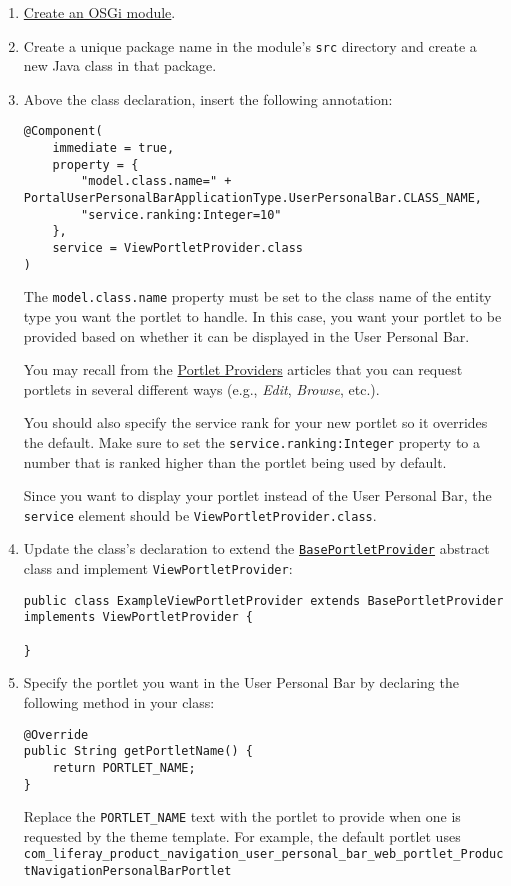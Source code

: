 \begin{enumerate}
\def\labelenumi{\arabic{enumi}.}
\item
  \href{/docs/7-2/reference/-/knowledge_base/r/creating-a-project}{Create
  an OSGi module}.
\item
  Create a unique package name in the module's \texttt{src} directory
  and create a new Java class in that package.
\item
  Above the class declaration, insert the following annotation:

\begin{verbatim}
@Component(
    immediate = true,
    property = {
        "model.class.name=" + PortalUserPersonalBarApplicationType.UserPersonalBar.CLASS_NAME,
        "service.ranking:Integer=10"
    },
    service = ViewPortletProvider.class
)
\end{verbatim}

  The \texttt{model.class.name} property must be set to the class name
  of the entity type you want the portlet to handle. In this case, you
  want your portlet to be provided based on whether it can be displayed
  in the User Personal Bar.

  You may recall from the
  \href{/docs/7-2/frameworks/-/knowledge_base/f/embedding-portlets-in-themes}{Portlet
  Providers} articles that you can request portlets in several different
  ways (e.g., \emph{Edit}, \emph{Browse}, etc.).

  You should also specify the service rank for your new portlet so it
  overrides the default. Make sure to set the
  \texttt{service.ranking:Integer} property to a number that is ranked
  higher than the portlet being used by default.

  Since you want to display your portlet instead of the User Personal
  Bar, the \texttt{service} element should be
  \texttt{ViewPortletProvider.class}.
\item
  Update the class's declaration to extend the
  \href{https://docs.liferay.com/dxp/portal/7.2-latest/javadocs/portal-kernel/com/liferay/portal/kernel/portlet/BasePortletProvider.html}{\texttt{BasePortletProvider}}
  abstract class and implement \texttt{ViewPortletProvider}:

\begin{verbatim}
public class ExampleViewPortletProvider extends BasePortletProvider implements ViewPortletProvider {

}
\end{verbatim}
\item
  Specify the portlet you want in the User Personal Bar by declaring the
  following method in your class:

\begin{verbatim}
@Override
public String getPortletName() {
    return PORTLET_NAME;
}
\end{verbatim}

  Replace the \texttt{PORTLET\_NAME} text with the portlet to provide
  when one is requested by the theme template. For example, the default
  portlet uses
  \texttt{com\_liferay\_product\_navigation\_user\_personal\_bar\_web\_portlet\_ProductNavigationPersonalBarPortlet}
\end{enumerate}

